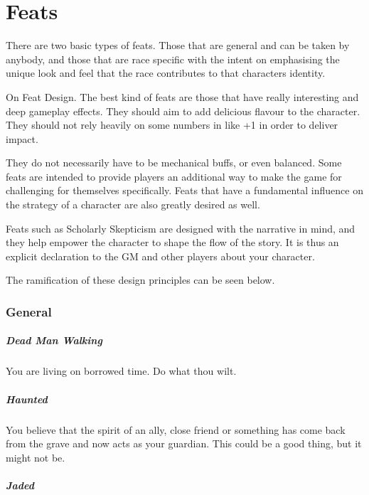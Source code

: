 \chapter{Feats}\label{feats}

There are two basic types of feats. Those that are general and can be taken by anybody, and those that are race specific with the intent on emphasising the unique look and feel that the race contributes to that characters identity. 

\begin{framed}\centering
        On Feat Design. The best kind of feats are those that have really interesting and deep gameplay effects. They should aim to add delicious flavour to the character. They should not rely heavily on some numbers in like +1 in order to deliver impact. 

They do not necessarily have to be mechanical buffs, or even balanced. Some feats are intended to provide players an additional way to make the game for challenging for themselves specifically. Feats that have a fundamental influence on the strategy of a character are also greatly desired as well. 

Feats such as Scholarly Skepticism are designed with the narrative in mind, and they help empower the character to shape the flow of the story. It is thus an explicit declaration to the GM and other players about your character.

The ramification of these design principles can be seen below.           
    \end{framed}

\subsection{General}
    \paragraph{Dead Man Walking} You are living on borrowed time. Do what thou wilt. 
    \paragraph{Haunted} You believe that the spirit of an ally, close friend or something has come back from the grave and now acts as your guardian. This could be a good thing, but it might not be.
    \paragraph{Jaded}
